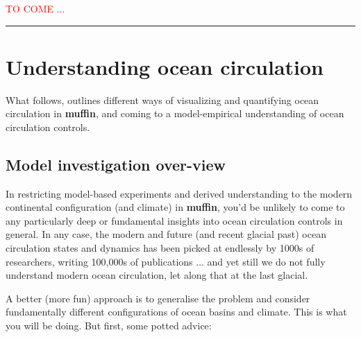 \documentclass[11pt,fleqn]{book} %
\begin{document}
\noindent\textcolor{red}{TO COME ...}

\vspace{1mm}
\noindent\rule{4cm}{0.5pt}
\vspace{2mm}


\newpage

%
\section{Understanding ocean circulation}


What follows, outlines different ways of visualizing and quantifying ocean circulation in \textbf{muffin}, and coming to a model-empirical understanding of ocean circulation controls.


\subsection{Model investigation over-view}

In restricting model-based experiments and derived understanding to   the modern continental configuration (and climate) in \textbf{muffin}, you'd be unlikely to come to any particularly deep or fundamental insights into ocean circulation controls in general. In any case, the modern and future (and recent glacial past) ocean circulation states and dynamics has been picked at endlessly by 1000s of researchers, writing 100,000s of  publications ... and yet still we do not fully understand modern ocean circulation, let along that at the last glacial. 

A better (more fun) approach is to generalise the problem and consider fundamentally different configurations of ocean basins and climate. This is what you will be doing. But first, some potted advice:
\end{document}
